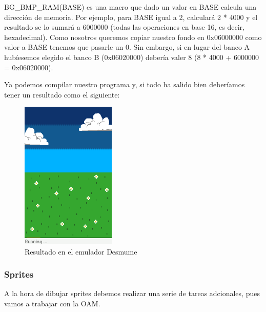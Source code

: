 \vspace{0.5cm}

BG\_BMP\_RAM(BASE) es una macro que dado un valor en  BASE calcula una dirección de memoria. Por ejemplo, para BASE igual a 2, calculará 2 * 4000 y el resultado se lo sumará a 6000000 (todas las operaciones en base 16, es decir, hexadecimal). Como nosotros queremos copiar nuestro fondo en 0x06000000 como valor a BASE tenemos que pasarle un 0. Sin embargo, si en lugar del banco A hubíesemos elegido el banco B (0x06020000) debería valer 8 (8 * 4000 + 6000000 = 0x06020000).

\vspace{0.5cm}

Ya podemos compilar nuestro programa y, si todo ha salido bien deberíamos tener un resultado como el siguiente:

\vspace{0.5cm}

\begin{figure}[htbp]
\centering
  \includegraphics[width=0.4\textwidth]{archivos/fondos.png}
  \caption{Resultado en el emulador Desmume}
  \label{fig:fondo}
\end{figure}

\vspace{0.5cm}

\subsubsection{Sprites}

A la hora de dibujar sprites debemos realizar una serie de tareas adcionales, pues vamos a trabajar con la OAM.

\vspace{0.5cm}

